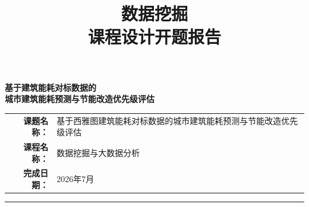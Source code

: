 \documentclass[12pt,a4paper]{ctexart}
\title{{\Huge\bfseries 数据挖掘\\[10pt] 课程设计开题报告}}
\author{}
\date{}
\begin{document}
\maketitle

\vspace{1.5cm}

\begin{center}
    {\LARGE\bfseries 基于建筑能耗对标数据的\\[8pt] 城市建筑能耗预测与节能改造优先级评估}

    \vspace{2cm}

    {\large\begin{tabular}{rl}
        \textbf{课题名称：} & 基于西雅图建筑能耗对标数据的城市建筑能耗预测与节能改造优先级评估 \\
        \textbf{课程名称：} & 数据挖掘与大数据分析 \\
        \textbf{完成日期：} & 2026年7月 \\
    \end{tabular}}
\end{center}

\vspace{1cm}
\begin{center}
    \rule{0.6\textwidth}{0.5pt}
\end{center}

\newpage

\tableofcontents
\newpage















\end{document}
